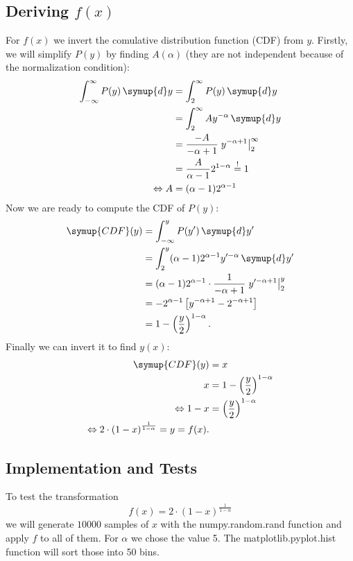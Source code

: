 \documentclass{article}
\begin{document}
\subsection{Deriving $f(x)$}
For $f(x)$ we invert the comulative distribution function (CDF) from $y$. Firstly, we will simplify $P(y)$ 
by finding $A(\alpha)$ (they are not independent because of the normalization condition):
\begin{align*}
  \int_{-\infty}^{\infty} P(y) \, \symup{d}y 
  &= \int_{2}^{\infty} P(y) \, \symup{d}y \\
  &= \int_{2}^{\infty} A y^{-\alpha} \, \symup{d}y \\
  &= \frac{-A}{-\alpha+1} \left. y^{-\alpha+1} \right\vert_2^\infty \\
  &= \frac{A}{\alpha - 1} 2^{1-\alpha} \overset{!}{=} 1 \\
  \Leftrightarrow
  A &= (\alpha - 1) 2^{\alpha - 1}
\end{align*}
Now we are ready to compute the CDF of $P(y)$:
\begin{align*}
  \symup{CDF}(y) &= \int_{-\infty}^{y} P(y^\prime) \, \symup{d}y^\prime  \\
                 &= \int_{2}^{y} (\alpha - 1) 2^{\alpha -1} y^{\prime-\alpha} \, \symup{d}y^\prime \\
                 &= (\alpha-1) 2^{\alpha-1} \cdot \frac{1}{-\alpha+1} \left. y^{\prime -\alpha +1} \right\vert_2^y \\
                 &= -2^{\alpha-1} \left[ y^{-\alpha+1} - 2^{-\alpha +1} \right] \\
                 &= 1 - \left( \frac{y}{2} \right)^{1-\alpha}.
\end{align*}
Finally we can invert it to find $y(x)$:
\begin{align*}
  \symup{CDF}(y) &= x \\
  x &= 1 - \left( \frac{y}{2} \right)^{1-\alpha} \\
  \Leftrightarrow 
  1 - x &= \left( \frac{y}{2} \right)^{1-\alpha} \\
  \Leftrightarrow
  2 \cdot \left(1 - x\right)^{\frac{1}{1-\alpha}} = y = f(x).
\end{align*}

\subsection{Implementation and Tests}
\label{sec:implementation}
To test the transformation 
\[
  f(x) = 2 \cdot \left(1 - x\right)^{\frac{1}{1-\alpha}}
\]
we will generate $10000$ samples of $x$ with the numpy.random.rand function and apply $f$ to all of them. For
$\alpha$ we chose the value 5.
The matplotlib.pyplot.hist function will sort those into 50 bins. 
\end{document}
